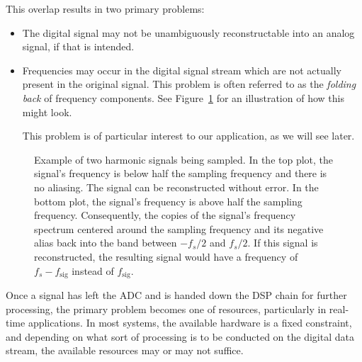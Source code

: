 This overlap results in two primary problems:
\begin{itemize}\tightlist
    \item
        The digital  signal may not  be unambiguously reconstructable  into an
        analog signal, if that is intended.
    \item
        Frequencies  may occur  in the  digital  signal stream  which are  not
        actually  present  in  the  original  signal. This  problem  is  often
        referred to  as the  \emph{folding back} of  frequency components. See
        Figure~\ref{fig:aliasing:dirac} for an illustration  of how this might
        look.

        This problem is of particular interest  to our application, as we will
        see later.
\end{itemize}

\begin{figure}
    \centering
    
    \caption[Aliasing With Harmonic Signals]{%
        Example of  two harmonic signals  being sampled. In the top  plot, the
        signal's frequency is  below half the sampling frequency  and there is
        no aliasing. The  signal can be  reconstructed without error.   In the
        bottom  plot,  the  signal's  frequency is  above  half  the  sampling
        frequency. Consequently, the copies of the signal's frequency spectrum
        centered around  the sampling  frequency and  its negative  alias back
        into  the  band  between  $-f_s/2$  and  $f_s/2$. If  this  signal  is
        reconstructed, the resulting  signal would have a frequency  of $f_s -
        f_{\mathrm{sig}}$ instead of $f_{\mathrm{sig}}$.%
    }
    \label{fig:aliasing:dirac}
\end{figure}


Once a signal  has left the ADC and  is handed down the DSP  chain for further
processing,  the primary  problem becomes  one of  resources, particularly  in
real-time applications. In  most systems,  the available  hardware is  a fixed
constraint, and depending on what sort of processing is to be conducted on the
digital data stream, the available resources may or may not suffice.

